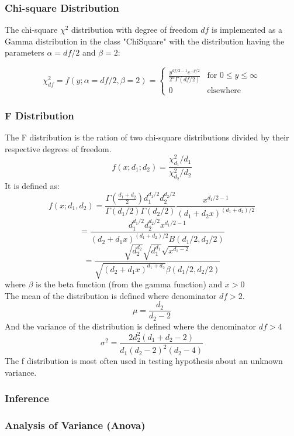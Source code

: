\documentclass[a4paper]{article}
\begin{document}
\subsubsection*{Chi-square Distribution}

The chi-square $\chi^2$ distribution with degree of freedom $df$ is implemented as a Gamma distribution in the class "ChiSquare" with the distribution having the parameters $\alpha = df/2$ and $\beta = 2$:

\[
\chi_{df}^2 = f(y; \alpha = df/2, \beta = 2) = 
	\begin{cases}
		\frac{ y^{df/2 - 1}e^{-y/2} }{ 2^{\alpha} \Gamma(df/2) } & \text{for } 0 \le y \le \infty \\
		0 & \text{elsewhere}
	\end{cases}
\]

\subsubsection*{F Distribution}

The F distribution is the ration of two chi-square distributions divided by their respective degrees of freedom.
$$
f(x; d_1; d_2) = \frac{\chi_{d_1}^2/d_1}{\chi_{d_2}^2/d_2}
$$
It is defined as:
$$
f(x; d_1, d_2) = \frac{ \Gamma\left( \frac{ d_1 + d_2 }{2} \right) d_1^{d_1/2} d_2^{d_2/2} } {\Gamma(d_1/2)\Gamma(d_2/2) } \frac{x^{d_1/2 - 1}}{(d_1 + d_2x)^{(d_1 + d_2)/2}}
$$
$$
= \frac{ d_1^{d_1/2} d_2^{d_2/2}x^{d_1/2 - 1} } { (d_2 + d_1x)^{(d_1+d_2)/2} B(d_1/2, d_2/2)}
$$
$$
= \frac{ \sqrt{d_2^{d_2}}  \sqrt{ d_1^{d_1}  } \sqrt{ x^{d_1-2} }  }{\sqrt{ (d_2+d_1x)^{d_1 + d_2} } \beta(d_1/2, d_2/2) }
$$
where $\beta$ is the beta function (from the gamma function) and $x > 0$\\
The mean of the distribution is defined where denominator $df > 2$.
$$
\mu = \frac{ d_2 }{d_2 - 2}
$$
And the variance of the distribution is defined where the denominator $df > 4$
$$
\sigma^2 = \frac{ 2 d_2^2 (d_1 + d_2 - 2) }{ d_1 (d_2 - 2)^2 (d_2 - 4) }
$$
The f distribution is most often used in testing hypothesis about an unknown variance.


\subsubsection{Inference}

\subsubsection*{Analysis of Variance (Anova)}
\end{document}
